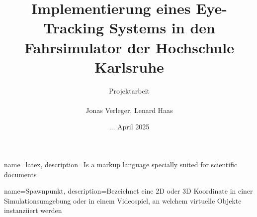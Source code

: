 \usepackage[ngerman]{babel}
\usepackage{graphicx}

\usepackage{tikz}

\usepackage{booktabs}

\usepackage{amsmath}
\usepackage{amssymb}

\usetikzlibrary{angles, quotes}
\graphicspath{ {./Bilder/} }

\usepackage{float}
\usepackage[utf8]{inputenc}

\usepackage[backend=biber,style=numeric]{biblatex}

\makeindex

\usepackage{glossaries}
\makeglossaries



{
    name=latex,
    description={Is a markup language specially suited for scientific documents}
}

{
    name=Spawnpunkt,
    description={Bezeichnet eine 2D oder 3D Koordinate in einer Simulationsumgebung oder in einem Videospiel, an welchem virtuelle Objekte instanziiert werden}
}



\title{Implementierung eines Eye-Tracking Systems in den Fahrsimulator der Hochschule Karlsruhe}

\author{\Large Projektarbeit \\ \\ Jonas Verleger, Lenard Haas}
\date{... April 2025}







  
\maketitle
\newpage
\tableofcontents
\newpage



